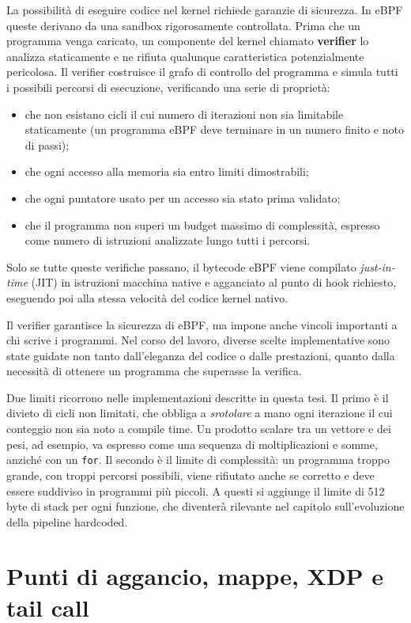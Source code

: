 \documentclass[binding=0.6cm,italian,oneside,noexaminfo]{sapthesis}
\begin{document}
La possibilità di eseguire codice nel kernel richiede garanzie di sicurezza. In eBPF queste derivano da una sandbox rigorosamente controllata. Prima che un programma venga caricato, un componente del kernel chiamato \textbf{verifier} lo analizza staticamente e ne rifiuta qualunque caratteristica potenzialmente pericolosa. Il verifier costruisce il grafo di controllo del programma e simula tutti i possibili percorsi di esecuzione, verificando una serie di proprietà:
\begin{itemize}
    \item che non esistano cicli il cui numero di iterazioni non sia limitabile staticamente (un programma eBPF deve terminare in un numero finito e noto di passi);
    \item che ogni accesso alla memoria sia entro limiti dimostrabili;
    \item che ogni puntatore usato per un accesso sia stato prima validato;
    \item che il programma non superi un budget massimo di complessità, espresso come numero di istruzioni analizzate lungo tutti i percorsi.
\end{itemize}

Solo se tutte queste verifiche passano, il bytecode eBPF viene compilato \emph{just-in-time} (JIT) in istruzioni macchina native e agganciato al punto di hook richiesto, eseguendo poi alla stessa velocità del codice kernel nativo.

Il verifier garantisce la sicurezza di eBPF, ma impone anche vincoli importanti a chi scrive i programmi. Nel corso del lavoro, diverse scelte implementative sono state guidate non tanto dall'eleganza del codice o dalle prestazioni, quanto dalla necessità di ottenere un programma che superasse la verifica.

Due limiti ricorrono nelle implementazioni descritte in questa tesi. Il primo è il divieto di cicli non limitati, che obbliga a \emph{srotolare} a mano ogni iterazione il cui conteggio non sia noto a compile time. Un prodotto scalare tra un vettore e dei pesi, ad esempio, va espresso come una sequenza di moltiplicazioni e somme, anziché con un \texttt{for}. Il secondo è il limite di complessità: un programma troppo grande, con troppi percorsi possibili, viene rifiutato anche se corretto e deve essere suddiviso in programmi più piccoli. A questi si aggiunge il limite di 512 byte di stack per ogni funzione, che diventerà rilevante nel capitolo sull'evoluzione della pipeline hardcoded.

\section{Punti di aggancio, mappe, XDP e tail call}
\end{document}
